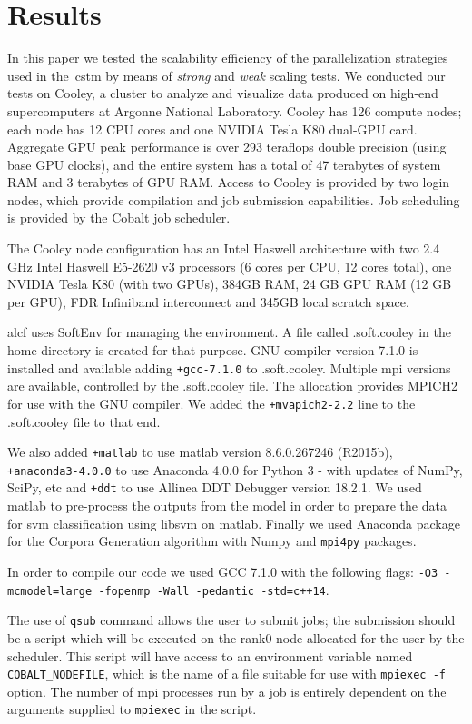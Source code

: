 \documentclass[10pt,journal,compsoc]{IEEEtran}
\begin{document}
\section{Results}

In this paper we tested the scalability efficiency of the parallelization strategies used in the~\gls{cstm} by means of \emph{strong} and \emph{weak} scaling tests. We conducted our tests on Cooley, a cluster to analyze and visualize data produced on high-end supercomputers at Argonne National Laboratory. Cooley has 126 compute nodes; each node has 12 CPU cores and one NVIDIA Tesla K80 dual-GPU card. Aggregate GPU peak performance is over 293 teraflops double precision (using base GPU clocks), and the entire system has a total of 47 terabytes of system RAM and 3 terabytes of GPU RAM. Access to Cooley is provided by two login nodes, which provide compilation and job submission capabilities. Job scheduling is provided by the Cobalt job scheduler.

The Cooley node configuration has an Intel Haswell architecture with two 2.4 GHz Intel Haswell E5-2620 v3 processors (6 cores per CPU, 12 cores total), one NVIDIA Tesla K80 (with two GPUs), 384GB RAM, 24 GB GPU RAM (12 GB per GPU), FDR Infiniband interconnect and 345GB local scratch space.

\gls{alcf} uses SoftEnv for managing the environment. A file called .soft.cooley in the home directory is created for that purpose. GNU compiler version 7.1.0 is installed and available adding \texttt{+gcc-7.1.0} to .soft.cooley. Multiple \gls{mpi} versions are available, controlled by the .soft.cooley file. The allocation provides MPICH2 for use with the GNU compiler. We added the \texttt{+mvapich2-2.2} line to the .soft.cooley file to that end.

We also added \texttt{+matlab} to use matlab version 8.6.0.267246 (R2015b), \texttt{+anaconda3-4.0.0} to use Anaconda 4.0.0 for Python 3 - with updates of NumPy, SciPy, etc and \texttt{+ddt} to use Allinea DDT Debugger version 18.2.1. We used matlab to pre-process the outputs from the model in order to prepare the data for \gls{svm} classification using \gls{libsvm} on matlab. Finally we used Anaconda package for the Corpora Generation algorithm with Numpy and \texttt{mpi4py} packages.

In order to compile our code we used GCC 7.1.0 with the following flags: \texttt{-O3 -mcmodel=large -fopenmp -Wall -pedantic -std=c++14}.

The use of \texttt{qsub} command allows the user to submit jobs; the submission should be a script which will be executed on the rank0 node allocated for the user by the scheduler. This script will have access to an environment variable named \texttt{COBALT\_NODEFILE}, which is the name of a file suitable for use with \texttt{mpiexec -f} option. The number of \gls{mpi} processes run by a job is entirely dependent on the arguments supplied to \texttt{mpiexec} in the script.
\end{document}
